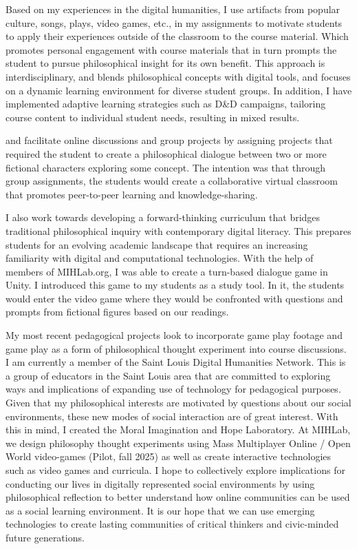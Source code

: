 \documentclass[
  letterpaper,
  DIV=11,
  numbers=noendperiod]{scrartcl}
\begin{document}
Based on my experiences in the digital humanities, I use artifacts from
popular culture, songs, plays, video games, etc., in my assignments to
motivate students to apply their experiences outside of the classroom to
the course material. Which promotes personal engagement with course
materials that in turn prompts the student to pursue philosophical
insight for its own benefit. This approach is interdisciplinary, and
blends philosophical concepts with digital tools, and focuses on a
dynamic learning environment for diverse student groups. In addition, I
have implemented adaptive learning strategies such as D\&D campaigns,
tailoring course content to individual student needs, resulting in mixed
results.

and facilitate online discussions and group projects by assigning
projects that required the student to create a philosophical dialogue
between two or more fictional characters exploring some concept. The
intention was that through group assignments, the students would create
a collaborative virtual classroom that promotes peer-to-peer learning
and knowledge-sharing.

I also work towards developing a forward-thinking curriculum that
bridges traditional philosophical inquiry with contemporary digital
literacy. This prepares students for an evolving academic landscape that
requires an increasing familiarity with digital and computational
technologies. With the help of members of MIHLab.org, I was able to
create a turn-based dialogue game in Unity. I introduced this game to my
students as a study tool. In it, the students would enter the video game
where they would be confronted with questions and prompts from fictional
figures based on our readings.

My most recent pedagogical projects look to incorporate game play
footage and game play as a form of philosophical thought experiment into
course discussions. I am currently a member of the Saint Louis Digital
Humanities Network. This is a group of educators in the Saint Louis area
that are committed to exploring ways and implications of expanding use
of technology for pedagogical purposes. Given that my philosophical
interests are motivated by questions about our social environments,
these new modes of social interaction are of great interest. With this
in mind, I created the Moral Imagination and Hope Laboratory. At MIHLab,
we design philosophy thought experiments using Mass Multiplayer Online /
Open World video-games (Pilot, fall 2025) as well as create interactive
technologies such as video games and curricula. I hope to collectively
explore implications for conducting our lives in digitally represented
social environments by using philosophical reflection to better
understand how online communities can be used as a social learning
environment. It is our hope that we can use emerging technologies to
create lasting communities of critical thinkers and civic-minded future
generations.
\end{document}
